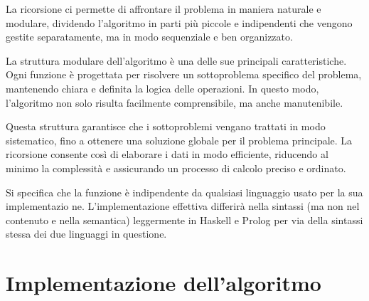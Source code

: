 \documentclass[a4paper,11pt]{article}
\begin{document}
  La ricorsione ci permette di affrontare il problema in maniera naturale e modulare, dividendo l'algoritmo in parti più piccole e indipendenti che vengono gestite separatamente, ma in modo sequenziale e ben organizzato.

La struttura modulare dell'algoritmo è una delle sue principali caratteristiche. Ogni funzione è progettata per risolvere un sottoproblema specifico del problema, mantenendo chiara e definita la logica delle operazioni. In questo modo, l'algoritmo non solo risulta facilmente comprensibile, ma anche manutenibile.

 Questa struttura garantisce che i sottoproblemi vengano trattati in modo sistematico, fino a ottenere una soluzione globale per il problema principale. La ricorsione consente così di elaborare i dati in modo efficiente, riducendo al minimo la complessità e assicurando un processo di calcolo preciso e ordinato.

  Si specifica che la funzione è indipendente da qualsiasi linguaggio usato per la sua implementazio
ne. L’implementazione effettiva differirà nella sintassi (ma non nel contenuto e nella semantica)
 leggermente in Haskell e Prolog per via della sintassi stessa dei due linguaggi in questione.

\newpage
\section{Implementazione dell'algoritmo}
\end{document}
